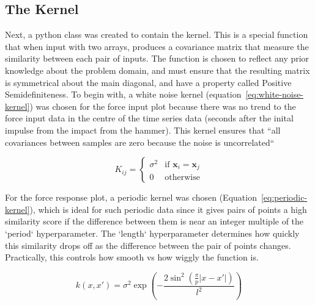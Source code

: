 \documentclass[12pt]{article}
\begin{document}
    \subsection{The Kernel}
    Next, a python class was created to contain the kernel.
    This is a special function that when input with two arrays, produces a covariance matrix that measure the similarity between each pair of inputs.
    The function is chosen to reflect any prior knowledge about the problem domain, and must ensure that the resulting matrix is symmetrical about the main diagonal, and have a property called Positive Semidefiniteness.
    To begin with, a white noise kernel (equation~\ref{eq:white-noise-kernel}) was chosen for the force input plot because there was no trend to the force input data in the centre of the time series data (seconds after the inital impulse from the impact from the hammer).
    This kernel ensures that ``all covariances between samples are zero because the noise is uncorrelated``~\cite{RoelantsGPKernels}

    \begin{equation}
        K_{ij} =
        \begin{cases}
            \sigma^2 & \text{if } \mathbf{x}_i = \mathbf{x}_j \\
            0 & \text{otherwise}
        \end{cases}\label{eq:white-noise-kernel}
    \end{equation}

    For the force response plot, a periodic kernel was chosen (Equation~\ref{eq:periodic-kernel}), which is ideal for such periodic data since it gives pairs of points a high similarity score if the difference between them is near an integer multiple of the `period` hyperparameter.
    The `length` hyperparameter determines how quickly this similarity drops off as the difference between the pair of points changes.
    Practically, this controls how smooth vs how wiggly the function is.

    \begin{equation}
        k(x, x') = \sigma^2 \exp\left(- \frac{2 \sin^2\left(\frac{\pi}{p} |x - x'|\right)}{l^2}\right)\label{eq:periodic-kernel}
    \end{equation}
\end{document}
